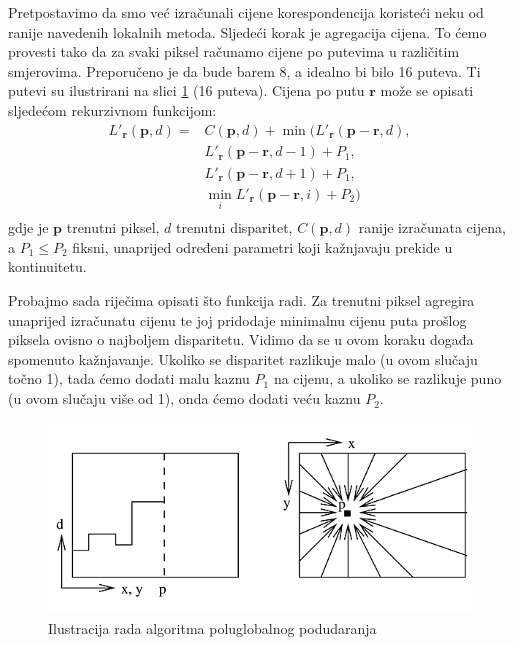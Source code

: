 \documentclass[utf8, zavrsni, numeric]{fer}
\begin{document}
Pretpostavimo da smo već izračunali cijene korespondencija koristeći neku od ranije navedenih lokalnih metoda.
Sljedeći korak je agregacija cijena. To ćemo provesti tako da za svaki piksel računamo cijene
po putevima u različitim smjerovima. Preporučeno je da bude barem 8, a idealno bi bilo 16 puteva. Ti putevi su ilustrirani na slici \ref{fig:SGM} (16 puteva). Cijena po putu $\mathbf{r}$
može se opisati sljedećom rekurzivnom funkcijom:
\begin{equation} \label{cijena_1}
  \begin{split}
    L'_{\mathbf{r}}(\mathbf{p}, d) = & C(\mathbf{p}, d) + \min(L'_{\mathbf{r}}(\mathbf{p} - \mathbf{r}, d), \\
    & L'_{\mathbf{r}}(\mathbf{p} - \mathbf{r}, d - 1) + P_1, \\
    & L'_{\mathbf{r}}(\mathbf{p} - \mathbf{r}, d + 1) + P_1, \\
    & \min\limits_{i} L'_{\mathbf{r}}(\mathbf{p} - \mathbf{r}, i) + P_2) \\
  \end{split}
\end{equation}
gdje je $\mathbf{p}$ trenutni piksel, $d$ trenutni disparitet, $C(\mathbf{p}, d)$ ranije
izračunata cijena, a $P_1 \leq P_2$ fiksni, unaprijed određeni parametri koji kažnjavaju
prekide u kontinuitetu.

Probajmo sada riječima opisati što funkcija radi. Za trenutni piksel agregira unaprijed izračunatu cijenu te joj pridodaje minimalnu cijenu puta prošlog piksela ovisno o najboljem disparitetu. Vidimo da se u ovom koraku događa spomenuto kažnjavanje.
Ukoliko se disparitet razlikuje malo (u ovom slučaju točno 1), tada ćemo dodati malu kaznu $P_1$ na cijenu, a ukoliko
se razlikuje puno (u ovom slučaju više od 1), onda ćemo dodati veću kaznu $P_2$.

\begin{figure}[H]
  \centering
  \includegraphics[width=12cm]{img/sgm.png}
  \caption{Ilustracija rada algoritma poluglobalnog podudaranja}
  \label{fig:SGM}
\end{figure}
\end{document}
